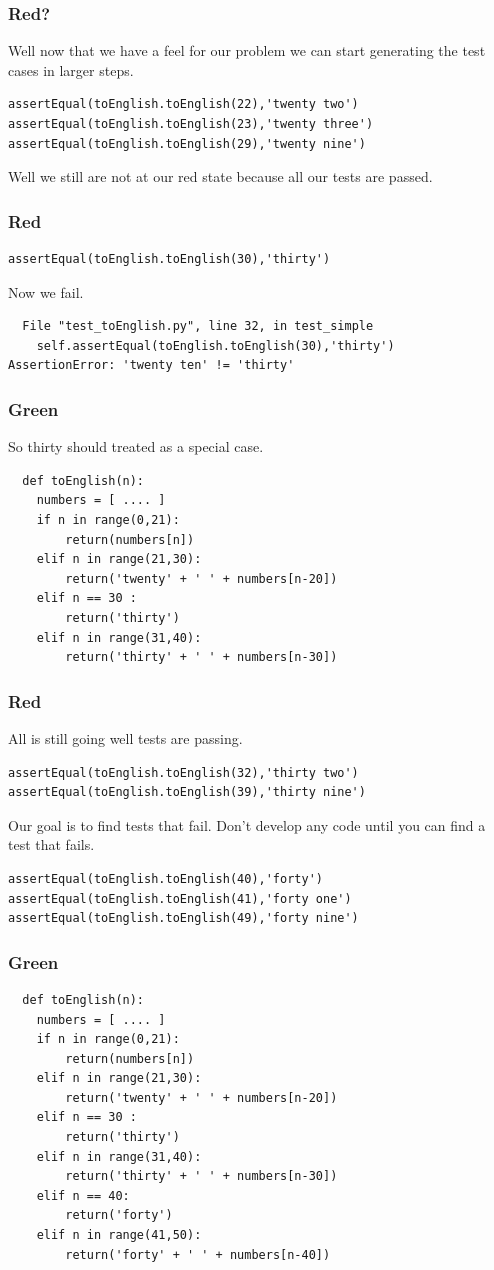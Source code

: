 \documentclass{beamer}
\begin{document}
\begin{frame}[fragile]
\frametitle{Red?}
Well now that we have a feel for our problem we can start generating
the test cases in larger steps.
\begin{lstlisting}
assertEqual(toEnglish.toEnglish(22),'twenty two')
assertEqual(toEnglish.toEnglish(23),'twenty three')
assertEqual(toEnglish.toEnglish(29),'twenty nine')
\end{lstlisting}
Well we still are not at our red state because all our tests are
passed.
\end{frame}
\begin{frame}[fragile]
\frametitle{Red}
\begin{lstlisting}
assertEqual(toEnglish.toEnglish(30),'thirty')
\end{lstlisting}
Now we fail.
\begin{verbatim}
  File "test_toEnglish.py", line 32, in test_simple
    self.assertEqual(toEnglish.toEnglish(30),'thirty')
AssertionError: 'twenty ten' != 'thirty'
\end{verbatim}  
\end{frame}
\begin{frame}[fragile]
  \frametitle{Green}
So thirty should  treated as a special case.
\begin{lstlisting}
  def toEnglish(n):
    numbers = [ .... ]
    if n in range(0,21):
        return(numbers[n])
    elif n in range(21,30):
        return('twenty' + ' ' + numbers[n-20])
    elif n == 30 :
        return('thirty')
    elif n in range(31,40):
        return('thirty' + ' ' + numbers[n-30])
\end{lstlisting}
\end{frame}
\begin{frame}[fragile]
\frametitle{Red}
All is still going well tests are passing. 
\begin{lstlisting}
assertEqual(toEnglish.toEnglish(32),'thirty two')
assertEqual(toEnglish.toEnglish(39),'thirty nine')
\end{lstlisting}
Our goal is to find tests that fail. Don't develop any code until you
can find a test that fails.
\begin{lstlisting}
assertEqual(toEnglish.toEnglish(40),'forty')
assertEqual(toEnglish.toEnglish(41),'forty one')
assertEqual(toEnglish.toEnglish(49),'forty nine')
\end{lstlisting}
\end{frame}
\begin{frame}[fragile]
  \frametitle{Green}
\begin{lstlisting}
  def toEnglish(n):
    numbers = [ .... ]
    if n in range(0,21):
        return(numbers[n])
    elif n in range(21,30):
        return('twenty' + ' ' + numbers[n-20])
    elif n == 30 :
        return('thirty')
    elif n in range(31,40):
        return('thirty' + ' ' + numbers[n-30])
    elif n == 40:
        return('forty')
    elif n in range(41,50):
        return('forty' + ' ' + numbers[n-40])
\end{lstlisting}
\end{frame}
\end{document}

